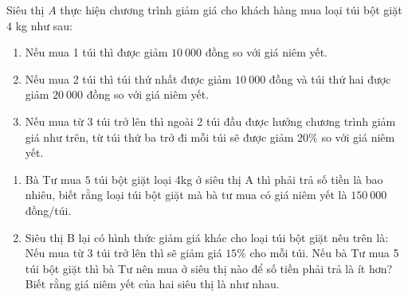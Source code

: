 \begin{ex}%
	Siêu thị $ A $ thực hiện chương trình giảm giá cho khách hàng mua loại túi bột giặt $4$ kg như sau:
	\begin{enumerate}[$\bullet$]
		\item Nếu mua 1 túi thì được giảm $ 10\ 000 $ đồng so với giá niêm yết. 
	 \item Nếu mua 2 túi thì túi thứ nhất được giảm $ 10\ 000 $ đồng và túi thứ hai được giảm $ 20\ 000 $ đồng so với giá niêm yết. 
	 \item Nếu mua từ 3 túi trở lên thì ngoài 2 túi đầu được hưởng chương trình giảm giá như trên, từ túi thứ ba trở đi mỗi túi sẽ được giảm $ 20\% $ so với giá niêm yết.
	 	\end{enumerate}
	\begin{enumerate}
		\item Bà Tư mua $ 5 $ túi bột giặt loại 4kg ở siêu thị A thì phải trả số tiền là bao nhiêu, biết rằng loại túi bột giặt mà bà tư mua có giá niêm yết là $ 150\ 000 $ đồng/túi.
		\item Siêu thị B lại có hình thức giảm giá khác cho loại túi bột giặt nêu trên là: Nếu mua từ 3 túi trở lên thì sẽ giảm giá $ 15\% $ cho mỗi túi. Nếu bà Tư mua 5 túi bột giặt thì bà Tư nên mua ở siêu thị nào để số tiền phải trả là ít hơn? Biết rằng giá niêm yết của hai siêu thị là như nhau.
	\end{enumerate}
	
\end{ex}

